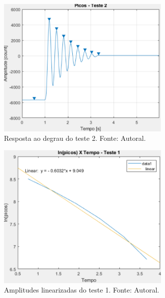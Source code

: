 \documentclass{ifacconf}
\begin{document}
\begin{figure}[!htb]
  \begin{center}
  \includegraphics[width=8.4cm]{figures/picos_teste_2.png}    %
  \caption{Resposta ao degrau do teste 2. Fonte: Autoral.} 
  \label{fig:picos_teste_2}
  \end{center}
\end{figure}

\begin{figure}[!htb]
  \begin{center}
  \includegraphics[width=8.4cm]{figures/regressao_teste_1.png}    %
  \caption{Amplitudes linearizadas do teste 1. Fonte: Autoral.} 
  \label{fig:regressao_teste_1}
  \end{center}
\end{figure}
\end{document}
